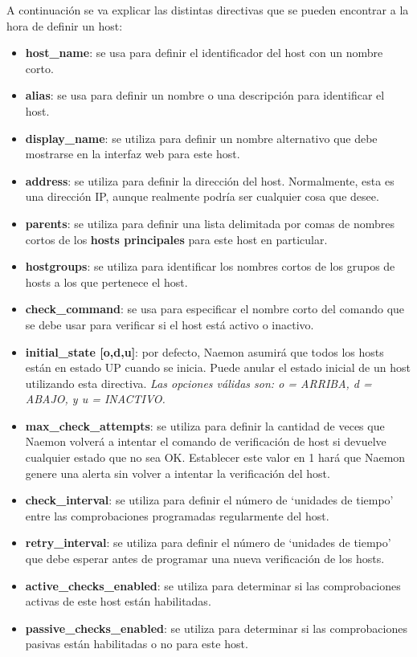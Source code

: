 A continuación se va explicar las distintas directivas que se pueden encontrar a la hora de definir un host:
\begin{itemize}
	\item \textbf{host\_name}: se usa para definir el identificador del host con un nombre corto.
	\item \textbf{alias}: se usa para definir un nombre o una descripción para identificar el host.	
	\item \textbf{display\_name}: se utiliza para definir un nombre alternativo que debe mostrarse en la interfaz web para este host.
	\item \textbf{address}: se utiliza para definir la dirección del host. Normalmente, esta es una dirección IP, aunque realmente podría ser cualquier cosa que desee. 
	\item \textbf{parents}: se utiliza para definir una lista delimitada por comas de nombres cortos de los \textbf{hosts principales} para este host en particular.
	\item \textbf{hostgroups}: se utiliza para identificar los nombres cortos de los grupos de hosts a los que pertenece el host.
	\item \textbf{check\_command}: se usa para especificar el nombre corto del comando que se debe usar para verificar si el host está activo o inactivo.
	\item \textbf{initial\_state	[o,d,u]}: por defecto, Naemon asumirá que todos los hosts están en estado UP cuando se inicia. Puede anular el estado inicial de un host utilizando esta directiva. \textit{Las opciones válidas son: o = ARRIBA, d = ABAJO, y u = INACTIVO.}
	\item \textbf{max\_check\_attempts}: se utiliza para definir la cantidad de veces que Naemon volverá a intentar el comando de verificación de host si devuelve cualquier estado que no sea OK. Establecer este valor en 1 hará que Naemon genere una alerta sin volver a intentar la verificación del host.	
	\item \textbf{check\_interval}: se utiliza para definir el número de `unidades de tiempo'  entre las comprobaciones programadas regularmente del host.	
	\item \textbf{retry\_interval}: se utiliza para definir el número de `unidades de tiempo' que debe esperar antes de programar una nueva verificación de los hosts. 	
	\item \textbf{active\_checks\_enabled}: se utiliza para determinar si las comprobaciones activas de este host están habilitadas. 
	\item \textbf{passive\_checks\_enabled}: se utiliza para determinar si las comprobaciones pasivas están habilitadas o no para este host. 	

\end{itemize}
